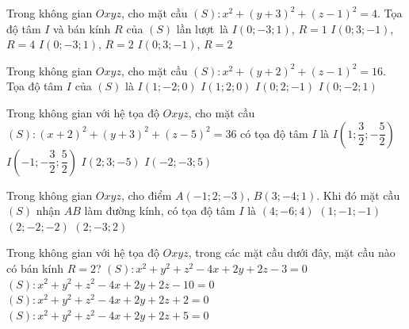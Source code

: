 \begin{ex}%
	 Trong không gian $Oxyz$, cho mặt cầu $(S) \colon x^2 +(y+3)^2 +(z-1)^2 =4$. Tọa độ tâm $I$ và bán kính $R$ của $(S)$ lần lượt~là
	\choice 
		{$I(0;-3;1)$, $R=1$} 
		{$I(0;3;-1)$, $R=4$} 
		{\True  $I(0;-3;1)$, $R=2$}
		{$I(0;3;-1)$, $R=2$} 
\end{ex}

\begin{ex}%
	Trong không gian $Oxyz$, cho mặt cầu  $(S)\colon x^2 + (y+2)^2 + (z-1)^2 = 16$. Tọa độ tâm $I$ của $(S)$ là
	\choice 
		{$I(1;-2;0)$} 
		{$I(1;2;0)$} 
		 {$I(0;2;-1)$}
		 {\True $I(0;-2;1)$}
\end{ex}

\begin{ex}%
	Trong không gian với hệ tọa độ $Oxyz$, cho mặt cầu  $(S) \colon (x+2)^2+(y+3)^2+(z-5)^2=36$ có tọa độ tâm $I$ là
	\choice 
		{$I  \left(1;\dfrac{3}{2};-\dfrac{5}{2}\right)$}
		{$I \left(-1;-\dfrac{3}{2};\dfrac{5}{2}\right)$} 
		 {$I \left(2;3;-5\right)$}
		{\True $I  \left(-2;-3;5\right)$}
\end{ex}

\begin{ex}%
	Trong không gian $Oxyz$, cho điểm $A(-1;2;-3)$, $B(3;-4;1)$. Khi  đó mặt cầu $(S)$ nhận $AB$ làm đường kính, có tọa độ tâm $I$ là
	\choice 
		 {$(4;-6;4)$}
		{\True  $(1;-1;-1)$}
		{$(2;-2;-2)$} 
		 {$(2;-3;2)$}
\end{ex}

\begin{ex}%
	Trong không gian với hệ tọa độ $Oxyz$,  trong các mặt cầu dưới đây, mặt cầu nào có bán kính $R=2$?
	 \choice
		{$(S)\colon x^2+y^2+z^2-4x+2y+2z-3=0$} 
		{$(S)\colon x^2+y^2+z^2-4x+2y+2z-10=0$} 
		{\True $(S)\colon  x^2+y^2+z^2-4x+2y+2z+2=0$}
		{$(S)\colon  x^2+y^2+z^2-4x+2y+2z+5=0$}
\end{ex}


